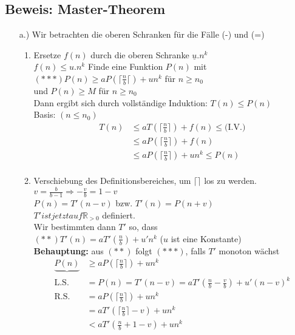 \subsection{Beweis: Master-Theorem}
\begin{enumerate}
\item[a.)] Wir betrachten die oberen Schranken für die Fälle (-) und (=)
\begin{enumerate}
\item Ersetze $f(n)$ durch die oberen Schranke $\underline{u}.n^k$\\
$f(n) \leq u.n^k$
Finde eine Funktion $P(n)$ mit %
$(***) P(n) \geq  a P(\lceil \frac{n}{b} \lceil) + u n^k$ für $n \geq n_0$\\
und $P(n) \geq M$ für $n \geq n_0$\\
Dann ergibt sich durch vollständige Induktion: $T(n) \leq P(n)$\\
Basis: $(n \leq n_0) $\\%
\begin{align*}
T(n) &\leq a T(\lceil \frac{n}{b} \rceil) + f(n) \leq \text{(I.V.)}\\
& \leq a P(\lceil \frac{n}{b} \rceil) + f(n)\\
& \leq a P(\lceil \frac{n}{b} \rceil) + u n^k \leq P(n)\\
\end{align*}
\item Verschiebung des Definitionsbereiches, um $\lceil \rceil$ los zu werden.\\
$v = \frac{b}{b-1} \Rightarrow -\frac{v}{b} = 1-v$\\
$P(n) = T'(n-v)$ bzw. $T'(n) = P(n+v)$\\
$T' ist jetzt auf \mathbb{R}_{>0}$ definiert.\\
Wir bestimmten dann $T'$ so, dass \\
$(**) T'(n) = a T'(\frac{n}{b}) + u' n^k$ ($u$ ist eine Konstante)\\
\textbf{Behauptung:} aus $(**)$ folgt $(***)$, falls $T'$ monoton wächst
\begin{align*}
\underbrace{P(n)} &\geq a P(\lceil \frac{n}{b} \rceil) + un^k\\
\text{L.S.}&=P(n) = T'(n-v) = a T'(\frac{n}{b} - \frac{v}{b})+u'(n-v)^k\\
\text{R.S.}&= a P(\lceil \frac{n}{b} \rceil) + un^k\\
&= a T'(\lceil \frac{n}{b} \rceil - v) + un^k\\
&< a T'(\frac{n}{b} +1 - v) + un^k\\

\end{align*}
\end{enumerate}
\end{enumerate}
